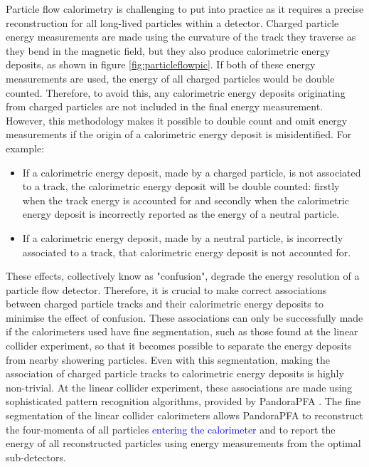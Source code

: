 Particle flow calorimetry is challenging to put into practice as it requires a precise reconstruction for all long-lived particles within a detector.  Charged particle energy measurements are made using the curvature of the track they traverse as they bend in the magnetic field, but they also produce calorimetric energy deposits, as shown in figure \ref{fig:particleflowpic}.  If both of these energy measurements are used, the energy of all charged particles would be double counted.  Therefore, to avoid this, any calorimetric energy deposits originating from charged particles are not included in the final energy measurement.  However, this methodology makes it possible to double count and omit energy measurements if the origin of a calorimetric energy deposit is misidentified.  For example:
\begin{itemize}
\item If a calorimetric energy deposit, made by a charged particle, is not associated to a track, the calorimetric energy deposit will be double counted: firstly when the track energy is accounted for and secondly when the calorimetric energy deposit is incorrectly reported as the energy of a neutral particle.  
\item If a calorimetric energy deposit, made by a neutral particle, is incorrectly associated to a track, that calorimetric energy deposit is not accounted for.
\end{itemize}
\noindent These effects, collectively know as "confusion", degrade the energy resolution of a particle flow detector.  Therefore, it is crucial to make correct associations between charged particle tracks and their calorimetric energy deposits to minimise the effect of confusion.  These associations can only be successfully made if the calorimeters used have fine segmentation, such as those found at the linear collider experiment, so that it becomes possible to separate the energy deposits from nearby showering particles.  Even with this segmentation, making the association of charged particle tracks to calorimetric energy deposits is highly non-trivial.  At the linear collider experiment, these associations are made using sophisticated pattern recognition algorithms, provided by PandoraPFA \cite{Marshall:2015rfa}.  The fine segmentation of the linear collider calorimeters allows PandoraPFA to reconstruct the four-momenta of all particles \textcolor{blue}{entering the calorimeter} and to report the energy of all reconstructed particles using energy measurements from the optimal sub-detectors.  

